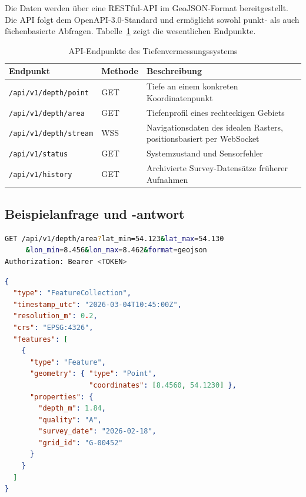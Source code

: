 ﻿\documentclass[a4paper,12pt]{article}
\theoremstyle{definition}
\begin{document}
Die Daten werden über eine RESTful-API im GeoJSON-Format bereitgestellt. Die API
folgt dem OpenAPI-3.0-Standard und ermöglicht sowohl punkt- als auch fächenbasierte
Abfragen. Tabelle~\ref{tab:endpunkte} zeigt die wesentlichen Endpunkte.

\begin{table}[H]
\centering
\caption{API-Endpunkte des Tiefenvermessungssystems}
\label{tab:endpunkte}
\renewcommand{\arraystretch}{1.3}
\begin{tabular}{@{}p{5cm}p{2cm}p{6cm}@{}}
\toprule
\textbf{Endpunkt} & \textbf{Methode} & \textbf{Beschreibung} \\
\midrule
\texttt{/api/v1/depth/point} & GET & Tiefe an einem konkreten Koordinatenpunkt \\
\texttt{/api/v1/depth/area} & GET & Tiefenprofil eines rechteckigen Gebiets \\
\texttt{/api/v1/depth/stream} & WSS & Navigationsdaten des idealen Rasters, positionsbasiert per WebSocket \\
\texttt{/api/v1/status} & GET & Systemzustand und Sensorfehler \\
\texttt{/api/v1/history} & GET & Archivierte Survey-Datens\"{a}tze fr\"{u}herer Aufnahmen \\
\bottomrule
\end{tabular}
\end{table}

\subsection{Beispielanfrage und -antwort}

\begin{lstlisting}[language=bash, caption={HTTP-Anfrage an den Tiefen-Endpunkt}]
GET /api/v1/depth/area?lat_min=54.123&lat_max=54.130
     &lon_min=8.456&lon_max=8.462&format=geojson
Authorization: Bearer <TOKEN>
\end{lstlisting}

\begin{lstlisting}[language=json, caption={GeoJSON-Antwort (Ausschnitt)}]
{
  "type": "FeatureCollection",
  "timestamp_utc": "2026-03-04T10:45:00Z",
  "resolution_m": 0.2,
  "crs": "EPSG:4326",
  "features": [
    {
      "type": "Feature",
      "geometry": { "type": "Point",
                    "coordinates": [8.4560, 54.1230] },
      "properties": {
        "depth_m": 1.84,
        "quality": "A",
        "survey_date": "2026-02-18",
        "grid_id": "G-00452"
      }
    }
  ]
}
\end{lstlisting}
\end{document}
